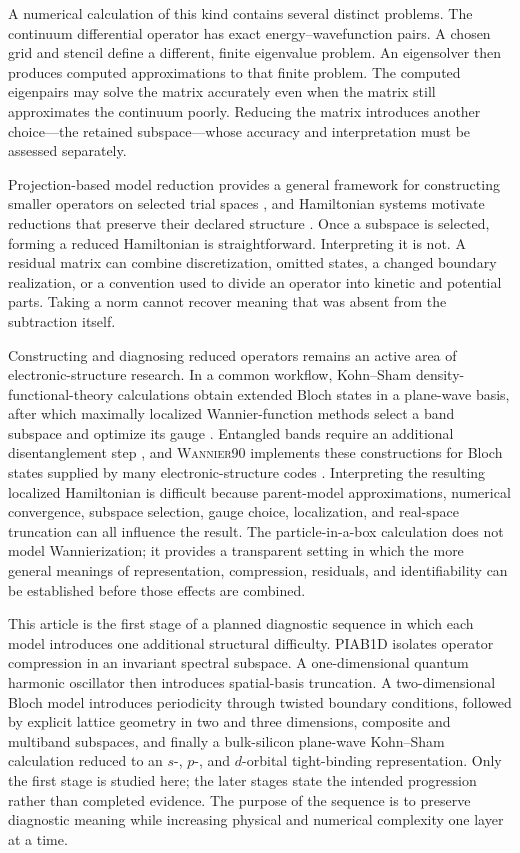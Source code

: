 \documentclass[11pt]{article}
\begin{document}
A numerical calculation of this kind contains several distinct problems. The
continuum differential operator has exact energy--wavefunction pairs. A chosen grid
and stencil define a different, finite eigenvalue problem. An eigensolver then
produces computed approximations to that finite problem. The computed eigenpairs may
solve the matrix accurately even when the matrix still approximates the continuum
poorly. Reducing the matrix introduces another choice---the retained subspace---whose
accuracy and interpretation must be assessed separately.

Projection-based model reduction provides a general framework for constructing
smaller operators on selected trial spaces \cite{bennerGugercinWillcox2015}, and
Hamiltonian systems motivate reductions that preserve their declared structure
\cite{pengMohseni2016}. Once a subspace is selected, forming a reduced Hamiltonian is
straightforward. Interpreting it is not. A residual matrix can combine discretization,
omitted states, a changed boundary realization, or a convention used to divide an
operator into kinetic and potential parts. Taking a norm cannot recover meaning that
was absent from the subtraction itself.

Constructing and diagnosing reduced operators remains an active area of
electronic-structure research. In a common workflow, Kohn--Sham
density-functional-theory calculations obtain extended Bloch states in a plane-wave
basis, after which maximally localized Wannier-function methods select a band subspace
and optimize its gauge \cite{marzariEtAl2012}. Entangled bands require an additional
disentanglement step \cite{souzaMarzariVanderbilt2001}, and \textsc{Wannier90}
implements these constructions for Bloch states supplied by many electronic-structure
codes \cite{mostofiEtAl2008,pizziEtAl2020}. Interpreting the resulting localized
Hamiltonian is difficult because parent-model approximations, numerical convergence,
subspace selection, gauge choice, localization, and real-space truncation can all
influence the result. The particle-in-a-box calculation does not model Wannierization;
it provides a transparent setting in which the more general meanings of
representation, compression, residuals, and identifiability can be established before
those effects are combined.

This article is the first stage of a planned diagnostic sequence in which each model
introduces one additional structural difficulty. PIAB1D isolates operator compression
in an invariant spectral subspace. A one-dimensional quantum harmonic oscillator then
introduces spatial-basis truncation. A two-dimensional Bloch model introduces
periodicity through twisted boundary conditions, followed by explicit lattice
geometry in two and three dimensions, composite and multiband subspaces, and finally a
bulk-silicon plane-wave Kohn--Sham calculation reduced to an $s$-, $p$-, and
$d$-orbital tight-binding representation. Only the first stage is studied here; the
later stages state the intended progression rather than completed evidence. The
purpose of the sequence is to preserve diagnostic meaning while increasing physical
and numerical complexity one layer at a time.
\end{document}
